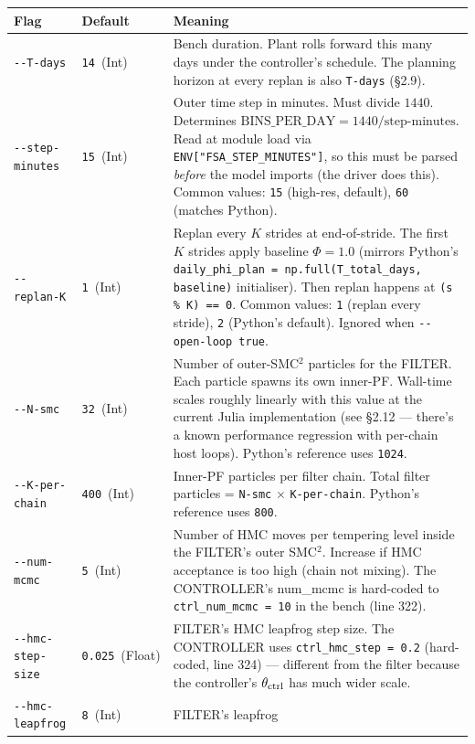 \documentclass[11pt,a4paper]{article}
\begin{document}
\begin{tabular}{@{}p{}p{}p{}@{}}
\toprule
Flag & Default & Meaning \\
\midrule
\texttt{-{}-T-days} & \texttt{14}~(Int) & Bench duration. Plant rolls
  forward this many days under the controller's schedule. The
  planning horizon at every replan is also \texttt{T-days} (\S 2.9). \\
\texttt{-{}-step-minutes} & \texttt{15}~(Int) & Outer time step in
  minutes. Must divide $1440$. Determines $\text{BINS\_PER\_DAY} =
  1440 / \text{step-minutes}$. Read at module load via
  \texttt{ENV["FSA\_STEP\_MINUTES"]}, so this must be parsed
  \emph{before} the model imports (the driver does this). Common
  values: \texttt{15} (high-res, default), \texttt{60} (matches Python). \\
\texttt{-{}-replan-K} & \texttt{1}~(Int) & Replan every $K$ strides at
  end-of-stride. The first $K$ strides apply baseline $\Phi=1.0$
  (mirrors Python's
  \texttt{daily\_phi\_plan = np.full(T\_total\_days, baseline)}
  initialiser). Then replan happens at \texttt{(s \% K) == 0}. Common
  values: \texttt{1} (replan every stride), \texttt{2} (Python's
  default). Ignored when \texttt{-{}-open-loop true}. \\
\texttt{-{}-N-smc} & \texttt{32}~(Int) & Number of outer-SMC$^2$
  particles for the FILTER. Each particle spawns its own inner-PF.
  Wall-time scales roughly linearly with this value at the current
  Julia implementation (see \S 2.12 — there's a known performance
  regression with per-chain host loops). Python's reference uses
  \texttt{1024}. \\
\texttt{-{}-K-per-chain} & \texttt{400}~(Int) & Inner-PF particles per
  filter chain. Total filter particles = \texttt{N-smc} $\times$
  \texttt{K-per-chain}. Python's reference uses \texttt{800}. \\
\texttt{-{}-num-mcmc} & \texttt{5}~(Int) & Number of HMC moves per
  tempering level inside the FILTER's outer SMC$^2$. Increase if
  HMC acceptance is too high (chain not mixing). The CONTROLLER's
  num\_mcmc is hard-coded to \texttt{ctrl\_num\_mcmc = 10} in the
  bench (line 322). \\
\texttt{-{}-hmc-step-size} & \texttt{0.025}~(Float) & FILTER's HMC
  leapfrog step size. The CONTROLLER uses
  \texttt{ctrl\_hmc\_step = 0.2} (hard-coded, line 324) — different
  from the filter because the controller's $\theta_{\rm ctrl}$ has
  much wider scale. \\
\texttt{-{}-hmc-leapfrog} & \texttt{8}~(Int) & FILTER's leapfrog

\end{tabular}
\end{document}
